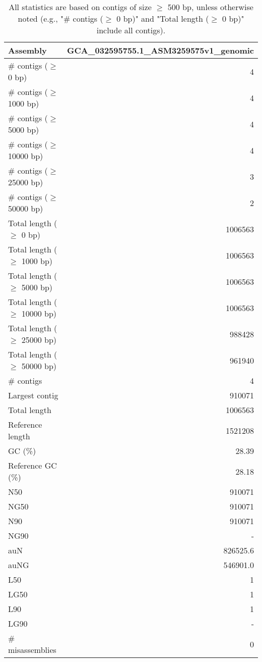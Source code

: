 \documentclass[12pt,a4paper]{article}
\begin{document}
\begin{table}[ht]
\begin{center}
\caption{All statistics are based on contigs of size $\geq$ 500 bp, unless otherwise noted (e.g., "\# contigs ($\geq$ 0 bp)" and "Total length ($\geq$ 0 bp)" include all contigs).}
\begin{tabular}{|l*{1}{|r}|}
\hline
Assembly & GCA\_032595755.1\_ASM3259575v1\_genomic \\ \hline
\# contigs ($\geq$ 0 bp) & 4 \\ \hline
\# contigs ($\geq$ 1000 bp) & 4 \\ \hline
\# contigs ($\geq$ 5000 bp) & 4 \\ \hline
\# contigs ($\geq$ 10000 bp) & 4 \\ \hline
\# contigs ($\geq$ 25000 bp) & 3 \\ \hline
\# contigs ($\geq$ 50000 bp) & 2 \\ \hline
Total length ($\geq$ 0 bp) & 1006563 \\ \hline
Total length ($\geq$ 1000 bp) & 1006563 \\ \hline
Total length ($\geq$ 5000 bp) & 1006563 \\ \hline
Total length ($\geq$ 10000 bp) & 1006563 \\ \hline
Total length ($\geq$ 25000 bp) & 988428 \\ \hline
Total length ($\geq$ 50000 bp) & 961940 \\ \hline
\# contigs & 4 \\ \hline
Largest contig & 910071 \\ \hline
Total length & 1006563 \\ \hline
Reference length & 1521208 \\ \hline
GC (\%) & 28.39 \\ \hline
Reference GC (\%) & 28.18 \\ \hline
N50 & 910071 \\ \hline
NG50 & 910071 \\ \hline
N90 & 910071 \\ \hline
NG90 & - \\ \hline
auN & 826525.6 \\ \hline
auNG & 546901.0 \\ \hline
L50 & 1 \\ \hline
LG50 & 1 \\ \hline
L90 & 1 \\ \hline
LG90 & - \\ \hline
\# misassemblies & 0 \\ \hline

\end{tabular}
\end{center}
\end{table}
\end{document}
